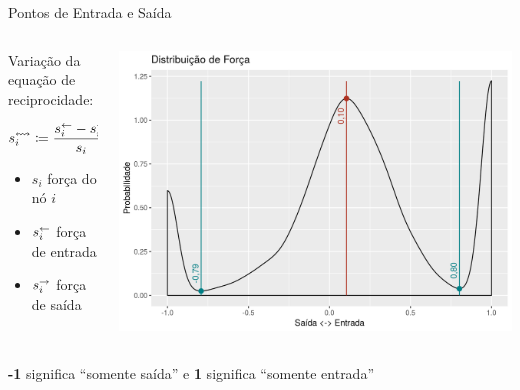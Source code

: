 \documentclass[10pt, hyperref={pdfpagelabels=false}]{beamer}
\begin{document}
\begin{frame}[label=hipotese-pontos-entrada-e-saida]{Pontos de Entrada e Saída}
  \begin{center}
    \begin{columns}[T,onlytextwidth]
      \begin{column}{0.5\textwidth}
        Variação da equação de reciprocidade:
        
        \begin{equation*}
          s_i^\leftrightsquigarrow \coloneqq \frac{s_i^\leftarrow - s_i^\rightarrow}{s_i}
        \end{equation*}
        
        \begin{itemize}
          \item[] $s_i$ força do nó $i$
          \item[] $s_i^\leftarrow$ força de entrada
          \item[] $s_i^\rightarrow$ força de saída
        \end{itemize}
      \end{column}
    
      \begin{column}{0.5\textwidth}
        \includegraphics[width=\textwidth]{distribuicao-de-forca}
      \end{column}
    \end{columns}
  
    \vspace{\baselineskip}
  
    \textbf{-1} significa \enquote{somente saída} e \textbf{1} significa \enquote{somente entrada}
  \end{center}
\end{frame}
\end{document}
